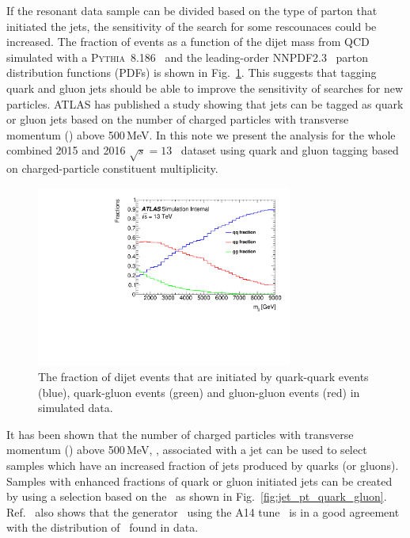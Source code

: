 If the resonant data sample can be divided based on the type of
parton that initiated the jets, the sensitivity of the search for some
rescounaces could be increased. 
The fraction of events as a function of  
the dijet mass from QCD  simulated with a  \textsc{Pythia~8.186}~\cite{pythia8} and the leading-order NNPDF2.3~\cite{Ball:2012cx} 
parton distribution functions (PDFs) is shown in Fig.~\ref{fig:quarkgluonfraction}. 
This suggests that tagging quark and gluon jets should be able to improve the sensitivity of searches for new particles. 
ATLAS has published a study \cite{ATL-PHYS-PUB-2017-009} showing that jets can be tagged as quark or gluon jets 
based on the number of charged particles with transverse momentum (\pt ) above 500\,MeV. 
In this note we present the analysis for the whole combined 2015 and
2016 $\sqrt{s} = 13$~\TeV\xspace dataset using quark 
and gluon tagging  based on charged-particle constituent multiplicity.

\begin{figure}[htb]
 \centering
\includegraphics[width=0.75\textwidth]{figures/tagging/Fractions_QCD.pdf}
\caption{The fraction of dijet events that are initiated by quark-quark events (blue), quark-gluon 
events (green) and gluon-gluon events (red) in simulated data.  \label{fig:quarkgluonfraction}}
\end{figure}

It has been shown that the number of charged particles with transverse
momentum (\pT ) above 500\,MeV, \ntrk, associated with a jet can be used
to select samples which have an increased fraction of jets produced by
quarks (or gluons). Samples with enhanced fractions of quark or gluon
initiated jets can be created by using a selection based on the \ntrk\
as shown in Fig.~\ref{fig:jet_pt_quark_gluon}.
Ref.~\cite{ATL-PHYS-PUB-2017-009} also shows that the 
generator~\cite{pythia8} using the A14 tune~\cite{A14tune} is in a good
agreement with the distribution of \ntrk\ found in data.



